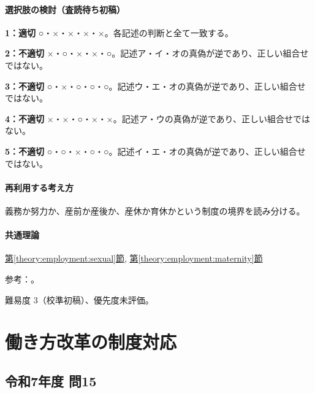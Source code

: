 \paragraph{選択肢の検討（査読待ち初稿）}\mbox{}\par

\noindent\textbf{1：適切} ○・×・×・×・×。各記述の判断と全て一致する。\par

\noindent\textbf{2：不適切} ×・○・×・×・○。記述ア・イ・オの真偽が逆であり、正しい組合せではない。\par

\noindent\textbf{3：不適切} ○・×・○・○・○。記述ウ・エ・オの真偽が逆であり、正しい組合せではない。\par

\noindent\textbf{4：不適切} ×・×・○・×・×。記述ア・ウの真偽が逆であり、正しい組合せではない。\par

\noindent\textbf{5：不適切} ○・○・×・○・○。記述イ・エ・オの真偽が逆であり、正しい組合せではない。\par

\paragraph{再利用する考え方} 義務か努力か、産前か産後か、産休か育休かという制度の境界を読み分ける。

\paragraph{共通理論} \hyperref[theory:employment:sexual]{第\ref*{theory:employment:sexual}節}, \hyperref[theory:employment:maternity]{第\ref*{theory:employment:maternity}節}

\par 参考：\cite{employment_sexual_current,employment_sexual2018,employment_sexual2018,employment_maternity_current,employment_maternity2014}。

\par 難易度 3（校準初稿）、優先度未評価。

\section{働き方改革の制度対応}

\subsection{令和7年度 問15}
\label{q:r07-reg-apt-15}

